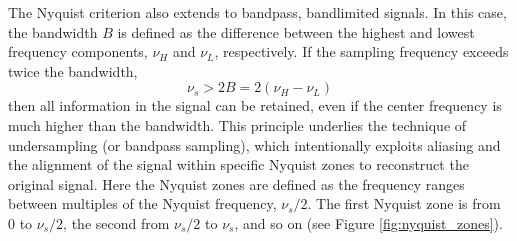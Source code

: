 The Nyquist criterion also extends to bandpass, bandlimited signals. In this case, the bandwidth $B$ is defined as the difference between the highest and lowest frequency components, $\nu_H$ and $\nu_L$, respectively. If the sampling frequency exceeds twice the bandwidth,
\begin{equation}
	\nu_s > 2B = 2(\nu_H - \nu_L)
\end{equation}
then all information in the signal can be retained, even if the center frequency is much higher than the bandwidth. This principle underlies the technique of undersampling (or bandpass sampling), which intentionally exploits aliasing and the alignment of the signal within specific Nyquist zones to reconstruct the original signal. Here the Nyquist zones are defined as the frequency ranges between multiples of the Nyquist frequency, $\nu_s/2$. The first Nyquist zone is from 0 to $\nu_s/2$, the second from $\nu_s/2$ to $\nu_s$, and so on (see Figure \ref{fig:nyquist_zones}).


